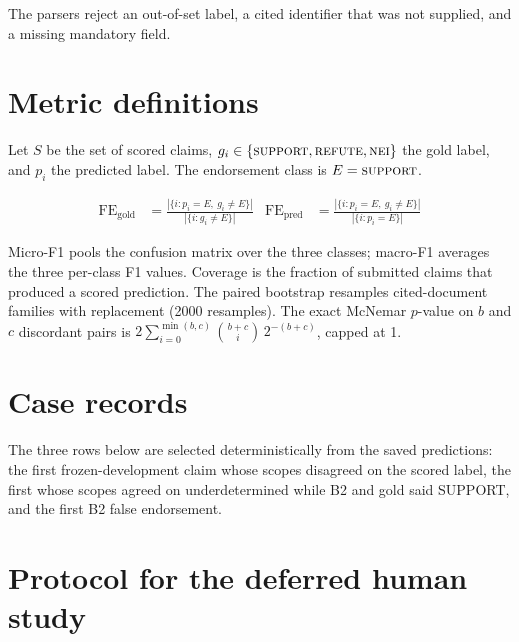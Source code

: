 \documentclass[11pt,a4paper]{article}
\begin{document}
The parsers reject an out-of-set label, a cited identifier that was not
supplied, and a missing mandatory field.

\section{Metric definitions}
\label{app:metrics}

Let $S$ be the set of scored claims, $g_i \in \{\textsc{support},
\textsc{refute}, \textsc{nei}\}$ the gold label, and $p_i$ the predicted
label. The endorsement class is $E=\textsc{support}$.

\begin{align}
\mathrm{FE}_{\text{gold}} &= \frac{|\{i : p_i = E,\ g_i \neq E\}|}{|\{i : g_i \neq E\}|}
&\mathrm{FE}_{\text{pred}} &= \frac{|\{i : p_i = E,\ g_i \neq E\}|}{|\{i : p_i = E\}|}
\end{align}

Micro-F1 pools the confusion matrix over the three classes; macro-F1
averages the three per-class F1 values. Coverage is the fraction of
submitted claims that produced a scored prediction. The paired
bootstrap resamples cited-document families with replacement (2000
resamples). The exact McNemar $p$-value on $b$ and $c$ discordant pairs
is $2\sum_{i=0}^{\min(b,c)}\binom{b+c}{i}\,2^{-(b+c)}$, capped at 1.

\section{Case records}
\label{app:cases}

The three rows below are selected deterministically from the saved
predictions: the first frozen-development claim whose scopes disagreed
on the scored label, the first whose scopes agreed on underdetermined
while B2 and gold said SUPPORT, and the first B2 false endorsement.

\begin{samepage}
\begin{center}
\label{tab:cases}

\end{center}
\end{samepage}

\section{Protocol for the deferred human study}
\label{app:human-study}
\end{document}
